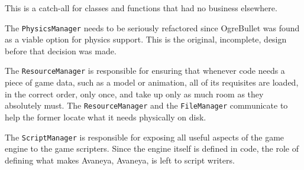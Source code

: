 \page 
{}
This is a catch-all for classes and functions that had no business elsewhere.

    {}

\page 
{}
The {\tt PhysicsManager} needs to be seriously refactored since OgreBullet was found as a viable option for physics support. This is the original, incomplete, design before that decision was made.

    {}

\page 
{}
The {\tt ResourceManager} is responsible for ensuring that whenever code needs a piece of game data, such as a model or animation, all of its requisites are loaded, in the correct order, only once, and take up only as much room as they absolutely must. The {\tt ResourceManager} and the {\tt FileManager} communicate to help the former locate what it needs physically on disk.

    {}

\page 
{}
The {\tt ScriptManager} is responsible for exposing all useful aspects of the game engine to the game scripters. Since the engine itself is defined in code, the role of defining what makes Avaneya, Avaneya, is left to script writers.

    {}


